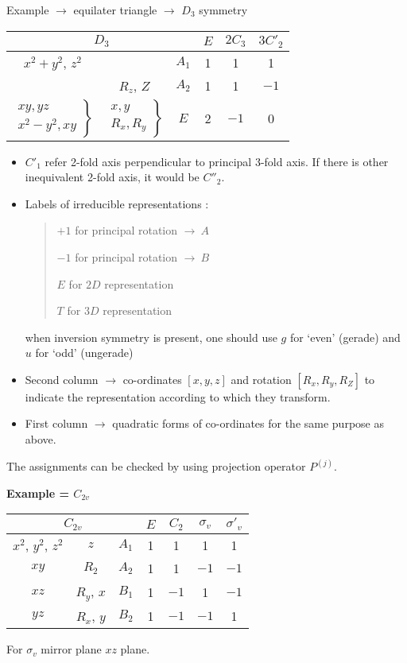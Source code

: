Example $\to$ equilater triangle $\to$ $D_{3}$ symmetry
\begin{center}
\begin{tabular}{|c|c|c|ccc|}
\hline
\multicolumn{3}{|c|}{$D_{3}$} & $E$ & $2C_{3}$ & $3C'_{2}$\\
\hline
$x^{2}+y^{2}$, $z^{2}$ & & $A_{1}$ & 1 & 1 & 1\\
\hline 
 & $R_{z}$, $Z$ & $A_{2}$ & 1 & 1 & $-1$\\
$\left.\begin{array}{l}
xy,yz\\
x^{2}-y^{2}, xy
\end{array}
\right\}$ & 
$\left.\begin{array}{l}
x,y\\
R_{x},R_{y}
\end{array}
\right\}$ 
& $E$ &  2 & $-1$ & 0\\
\hline
\end{tabular}
\end{center}
\begin{itemize}
\item $C'_{1}$ refer 2-fold axis perpendicular to principal 3-fold axis. If there is other inequivalent 2-fold axis, it would be $C''_{2}$.

\item Labels of irreducible representations :
\begin{quote}
$+1$ for principal rotation $\to \ A$

$-1$ for principal rotation $\to \ B$

$E$ for $2D$ representation

$T$ for $3D$ representation
\end{quote}
when inversion symmetry is present, one should use $g$ for `even' (gerade) and $u$ for `odd' (ungerade)

\item Second column $\to$ co-ordinates $[x,y,z]$ and rotation $[R_{x}, R_{y},R_{Z}]$ to indicate the representation according to which they transform.

\item First column $\to$ quadratic forms of co-ordinates for the same purpose as above.
\end{itemize}
The assignments can be checked by using projection operator $P^{(j)}$.

\medskip
\noindent
{\bf Example = $C_{2v}$}
\begin{center}
\begin{tabular}{|c|c|c|cccc|}
\hline
\multicolumn{3}{|c|}{$C_{2v}$} & $E$ & $C_{2}$ & $\sigma_{v}$ & $\sigma'_{v}$\\
\hline
$x^{2}$, $y^{2}$, $z^{2}$ & $z$ & $A_{1}$ & 1 & 1 & 1 & 1\\
$xy$ & $R_{2}$ & $A_{2}$ & 1 & 1 & $-1$ & $-1$\\
$xz$ & $R_{y}$, $x$ & $B_{1}$ & 1 & $-1$ & 1 & $-1$\\
$yz$ & $R_{x}$, $y$ & $B_{2}$ & 1 & $-1$ & $-1$ & 1\\
\hline 
\end{tabular}
\end{center}
For $\sigma_{v}$ mirror plane $xz$ plane.

